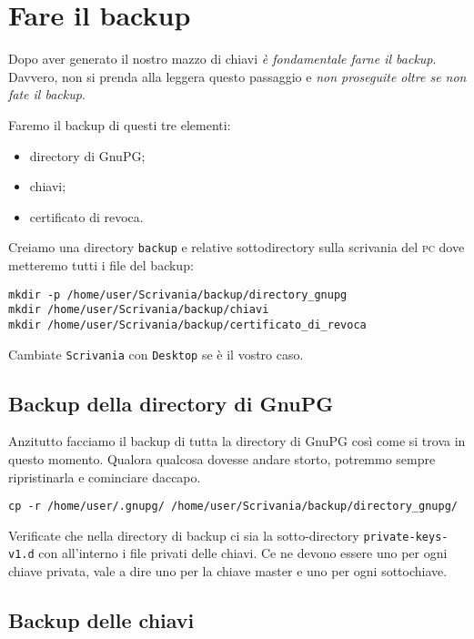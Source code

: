 \chapter{Fare il backup}

Dopo aver generato il nostro mazzo di chiavi \emph{è fondamentale farne il
backup}. Davvero, non si prenda alla leggera questo passaggio e \emph{non
proseguite oltre se non fate il backup}.

Faremo il backup di questi tre elementi:

\begin{itemize}
    \item directory di GnuPG;
    \item chiavi;
    \item certificato di revoca.
\end{itemize}

Creiamo una directory \texttt{backup} e relative sottodirectory sulla scrivania
del \textsc{pc} dove metteremo tutti i file del backup:

\begin{lstlisting}
mkdir -p /home/user/Scrivania/backup/directory_gnupg
mkdir /home/user/Scrivania/backup/chiavi
mkdir /home/user/Scrivania/backup/certificato_di_revoca
\end{lstlisting}


Cambiate \texttt{Scrivania} con \texttt{Desktop} se è il vostro caso.

\section{Backup della directory di GnuPG}
\label{backup-directory-gnupg}

Anzitutto facciamo il backup di tutta la directory di GnuPG così come si trova
in questo momento. Qualora qualcosa dovesse andare storto, potremmo sempre
ripristinarla e cominciare daccapo.

\begin{lstlisting}
cp -r /home/user/.gnupg/ /home/user/Scrivania/backup/directory_gnupg/
\end{lstlisting}

Verificate che nella directory di backup ci sia la sotto-directory\newline
\texttt{private-keys-v1.d} con all'interno i file privati delle chiavi. Ce ne
devono essere uno per ogni chiave privata, vale a dire uno per la chiave master
e uno per ogni sottochiave.

\section{Backup delle chiavi} \label{backup-chiavi}

